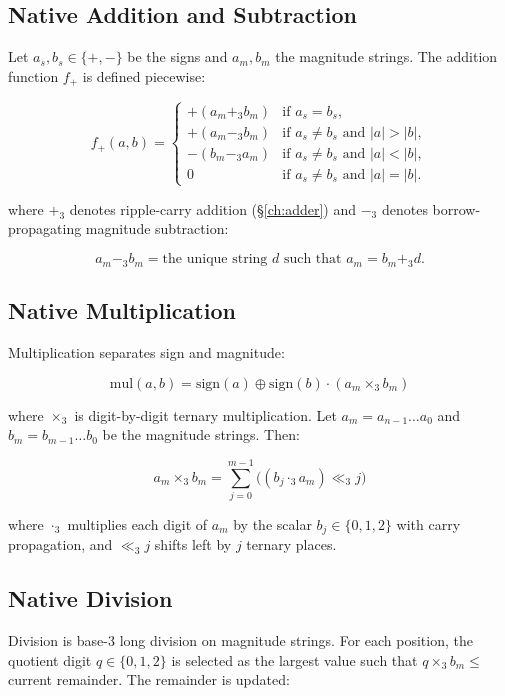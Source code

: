 \documentclass[12pt,a4paper,twoside]{book}
\theoremstyle{trinarytheorem}
\theoremstyle{trinarydefinition}
\begin{document}
\subsection{Native Addition and Subtraction}

Let $a_s, b_s \in \{+,-\}$ be the signs and $a_m, b_m$ the magnitude
strings. The addition function $f_+$ is defined piecewise:

\[
f_+(a,b) =
\begin{cases}
  +(a_m +_3 b_m) & \text{if } a_s = b_s, \\
  +(a_m -_3 b_m) & \text{if } a_s \neq b_s \text{ and } |a| > |b|, \\
  -(b_m -_3 a_m) & \text{if } a_s \neq b_s \text{ and } |a| < |b|, \\
  0              & \text{if } a_s \neq b_s \text{ and } |a| = |b|.
\end{cases}
\]

where $+_3$ denotes ripple-carry addition (\S\ref{ch:adder})
and $-_3$ denotes borrow-propagating magnitude subtraction:

\[
a_m -_3 b_m = \text{the unique string } d \text{ such that } a_m = b_m +_3 d.
\]

\subsection{Native Multiplication}

Multiplication separates sign and magnitude:

\[
\text{mul}(a,b) = \text{sign}(a) \oplus \text{sign}(b) \cdot (a_m \times_3 b_m)
\]

where $\times_3$ is digit-by-digit ternary multiplication. Let
$a_m = a_{n-1}\ldots a_0$ and $b_m = b_{m-1}\ldots b_0$ be the
magnitude strings. Then:

\[
a_m \times_3 b_m = \sum_{j=0}^{m-1} \bigl( (b_j \cdot_3 a_m) \ll_3 j \bigr)
\]

where $\cdot_3$ multiplies each digit of $a_m$ by the scalar $b_j \in \{0,1,2\}$
with carry propagation, and $\ll_3 j$ shifts left by $j$ ternary places.

\subsection{Native Division}

Division is base-3 long division on magnitude strings. For each
position, the quotient digit $q \in \{0,1,2\}$ is selected as the
largest value such that $q \times_3 b_m \leq$ current remainder. The
remainder is updated:
\end{document}
